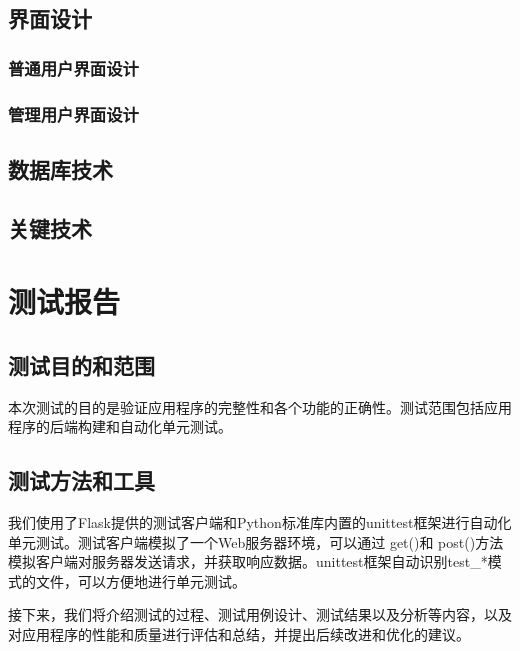 \documentclass[lang=cn,11pt,a4paper]{elegantpaper}
\begin{document}
\subsection{界面设计}

\subsubsection{普通用户界面设计}

\subsubsection{管理用户界面设计}

\subsection{数据库技术}

\subsection{关键技术}

\clearpage

\section{测试报告}
\subsection{测试目的和范围}
本次测试的目的是验证应用程序的完整性和各个功能的正确性。测试范围包括应用程序的后端构建和自动化单元测试。

\subsection{测试方法和工具}
我们使用了Flask提供的测试客户端和Python标准库内置的unittest框架进行自动化单元测试。测试客户端模拟了一个Web服务器环境，可以通过 get()和 post()方法模拟客户端对服务器发送请求，并获取响应数据。unittest框架自动识别test\_*模式的文件，可以方便地进行单元测试。

接下来，我们将介绍测试的过程、测试用例设计、测试结果以及分析等内容，以及对应用程序的性能和质量进行评估和总结，并提出后续改进和优化的建议。
\end{document}
